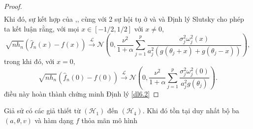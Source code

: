 \begin{proof}
\begin{align}
    \label{9.23}
\end{align}
Khi đó, sự kết hợp của ,, cùng với 2 sự hội tụ ở  và  và Định lý Slutsky cho phép ta kết luận rằng, với mọi $x \in[-1 / 2,1 / 2]$ với $x \neq 0$,
$$
\sqrt{n h_{n}}\left(\widehat{f}_{n}(x)-f(x)\right) \stackrel{\mathcal{L}}{\longrightarrow} \mathcal{N}\left(0, \frac{\nu^{2}}{1+\alpha} \sum_{j=1}^{p} \frac{\sigma_{j}^{2} \omega_{j}^{2}(x)}{a_{j}^{2}\left(g\left(\theta_{j}+x\right)+g\left(\theta_{j}-x\right)\right)}\right),
$$
trong khi đó, với $x=0$,
$$
\sqrt{n h_{n}}\left(\widehat{f}_{n}(0)-f(0)\right) \stackrel{\mathcal{L}}{\longrightarrow} \mathcal{N}\left(0, \frac{\nu^{2}}{1+\alpha} \sum_{j=1}^{p} \frac{\sigma_{j}^{2} \omega_{j}^{2}(0)}{a_{j}^{2} g\left(\theta_{j}\right)}\right).
$$
điều này hoàn thành chứng minh Định lý \ref{dl6.2}
\end{proof}
{\dl Giả sử có các giả thiết từ $\left(\mathcal{H}_{1}\right)$ đến $\left(\mathcal{H}_{4}\right).$ Khi đó tồn tại duy nhất bộ ba$\left(a,\theta, v\right)$ và hàm dạng $f$ thỏa mãn mô hình }
